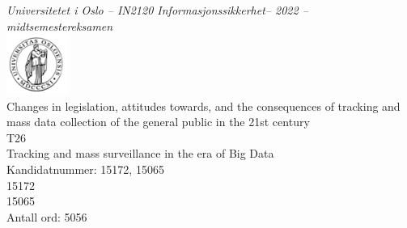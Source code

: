 \documentclass[11pt]{article}
\newcommand{\tittel}{Changes in legislation, attitudes towards, and the consequences of tracking and mass data collection of the general public in the 21st century}
\newcommand{\temanr}{T26} %
\newcommand{\tematittel}{Tracking and mass surveillance in the era of Big Data} %
\newcommand{\kandidatnr}{15172, 15065} %
\newcommand{\kandidatnrforside}{15172 \\ 15065}  %
\newcommand{\antallord}{5056} %
\begin{document}
 \thispagestyle{empty}
\begin{center}
\normalsize{\textit{Universitetet i Oslo -- IN2120 Informasjonssikkerhet-- 2022 -- midtsemestereksamen}} \\
\vspace{1cm}
\includegraphics[width=0.15\textwidth]{uio_logo.png} \\
\vspace{1cm}
\huge{\tittel} \\
\Large{\temanr} \\
\Large{\tematittel} \\
\vspace{1cm}
\Large{Kandidatnummer: \kandidatnr} \\
\large{\kandidatnrforside} \\
\vspace{1cm}
\Large{Antall ord: \antallord} \\
\end{center}
\tableofcontents
\newpage
\end{document}
